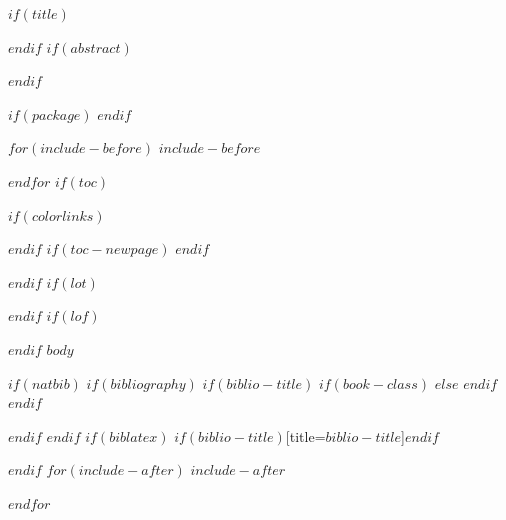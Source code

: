 \documentclass[$if(fontsize)$$fontsize$,$endif$$if(lang)$$babel-lang$,$endif$$if(papersize)$$papersize$paper,$endif$$for(classoption)$$classoption$$sep$,$endfor$]{$documentclass$}
\title{}
\subtitle{$subtitle$}
\author{}
\date{$date$}
\date{}
\begin{document}
$if(title)$
\maketitle
$endif$
$if(abstract)$
\begin{abstract}
$abstract$
\end{abstract}
$endif$

$if(package)$
$endif$

$for(include-before)$
$include-before$

$endfor$
$if(toc)$
{
$if(colorlinks)$

$endif$
\setcounter{tocdepth}{$toc-depth$}
$if(toc-newpage)$
\newpage
$endif$
\tableofcontents
\newpage
}
$endif$
$if(lot)$
\listoftables
$endif$
$if(lof)$
\listoffigures
$endif$
$body$

$if(natbib)$
$if(bibliography)$
$if(biblio-title)$
$if(book-class)$
\renewcommand\bibname{$biblio-title$}
$else$
\renewcommand\refname{$biblio-title$}
$endif$
$endif$


$endif$
$endif$
$if(biblatex)$
\printbibliography$if(biblio-title)$[title=$biblio-title$]$endif$

$endif$
$for(include-after)$
$include-after$

$endfor$
\end{document}

